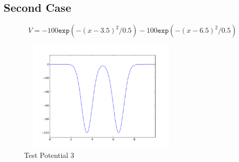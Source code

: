 \documentclass[a4paper,10pt]{report}
\begin{document}
\newpage
\subsection{Second Case}
\begin{equation}\label{potentialdef3}
V = -100\mathtt{exp}(-(x-3.5)^2/0.5)-100\mathtt{exp}(-(x-6.5)^2/0.5)
\end{equation}
\begin{figure}[hb]
\centering
\includegraphics[width=225pt, height=150pt]{potential1d2.png}
\caption[\textwidth]{Test Potential 3}
\end{figure}
\end{document}
